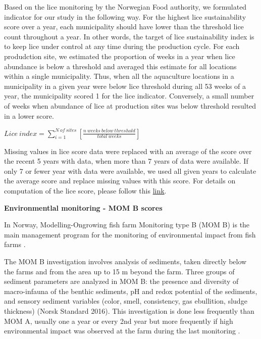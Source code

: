 \documentclass[
]{book}
\begin{document}
Based on the lice monitoring by the Norwegian Food authority, we formulated indicator for our study in the following way. For the highest lice sustainability score over a year, each municipality should have lower than the threshold lice count throughout a year. In other words, the target of lice sustainability index is to keep lice under control at any time during the production cycle. For each produdction site, we estimated the proportion of weeks in a year when lice abundance is below a threshold and averaged this estimate for all locations within a single municipality. Thus, when all the aquaculture locations in a municipality in a given year were below lice threshold during all 53 weeks of a year, the municipality scored 1 for the lice indicator. Conversely, a small number of weeks when abundance of lice at production sites was below threshold resulted in a lower score.

\(Lice \ index = \sum_{i = 1}^{N \ of \ sites}[\frac{n \ weeks\ below_ \ threshold}{total\ weeks}]\)

Missing values in lice score data were replaced with an average of the score over the recent 5 years with data, when more than 7 years of data were available. If only 7 or fewer year with data were available, we used all given years to calculate the average score and replace missing values with this score.
For details on computation of the lice score, please follow this \href{https://ohi-norway.github.io/nor-prep/prep/food_provision/Mariculture/lice_count_at_localities.html}{link}.

\textbf{Environmentlal monitoring - MOM B scores}

In Norway, Modelling-Ongrowing fish farm Monitoring type B (MOM B) is the main management program for the monitoring of environmental impact from fish farms \citep{ervik1997regulating}.

The MOM B investigation involves analysis of sediments, taken directly below the farms and from the area up to 15 m beyond the farm. Three groups of sediment parameters are analyzed in MOM B: the presence and diversity of macro-infauna of the benthic sediments, pH and redox potential of the sediments, and sensory sediment variables (color, smell, consistency, gas ebullition, sludge thickness) (Norsk Standard 2016). This investigation is done less frequently than MOM A, usually one a year or every 2nd year but more frequently if high environmental impact was observed at the farm during the last monitoring \citep{norge2016miljoovervaaking}.
\end{document}
